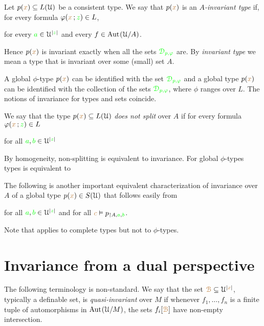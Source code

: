 \documentclass[creche.tex]{subfiles}
\begin{document}
Let $p({\color{brown} x})\subseteq L(\EuScript U)$ be a consistent type.
We say that $p({\color{brown} x})$ is an \emph{$A$-invariant type\/} if, for every formula $\varphi({\color{brown} x}\,;{\color{green} z})\in L$, 

\hfill for every ${\color{green} a}\in\EuScript U^{|{\color{green} z}|}$ and every $f\in{\rm Aut\kern.15ex}(\EuScript U/A)$.

Hence $p({\color{brown} x})$ is invariant exactly when all the sets $\color{green}\EuScript D_{p,\varphi}$ are. 
By \emph{invariant type\/} we mean a type that is invariant over some (small) set $A$.

A global $\phi$-type $p({\color{brown} x})$ can be identified with the set ${\color{green}\EuScript D_{p,\varphi}}$ and a global type $p({\color{brown} x})$ can be identified with the collection of the sets ${\color{green}\EuScript D_{p,\varphi}}$, where $\phi$ ranges over $L$.
The notions of invariance for types and sets coincide.

We say that the type $p({\color{brown} x})\subseteq L(\EuScript U)$ \emph{does not split\/} over $A$ if for every formula $\varphi({\color{brown} x}\,;{\color{green} z})\in L$

\hfill for all ${\color{green} a},{\color{green} b}\in\EuScript U^{|{\color{green} z}|}$

By homogeneity, non-splitting is equivalent to invariance.
For global $\phi$-types types  is equivalent to


The following is another important equivalent characterization of invariance over $A$ of a global type $p({\color{brown} x})\in S(\EuScript U)$ that follows easily  from 

\hfill for all ${\color{green} a},{\color{green} b}\in\EuScript U^{|{\color{green} z}|}$ and for all ${\color{brown} c}\vDash p_{\restriction A,{\color{green} a},{\color{green} b}}$.

Note that  applies to complete types but not to $\phi$-types.

\section{Invariance from a dual perspective}

\noindent\llap{\textcolor{red}{\Large\warning}\kern1.5ex}The following terminology is non-standard.
We say that the set ${\color{brown}\EuScript B}\subseteq\EuScript U^{|{\color{brown} x}|}$, typically a definable set, is \emph{quasi-invariant\/} over $M$ if whenever $f_1,\dots,f_n$ is a finite tuple of automorphisms in ${\rm Aut\kern.15ex}(\EuScript U/M)$, the sets $f_i[{\color{brown}\EuScript B}]$ have non-empty intersection.
\end{document}
